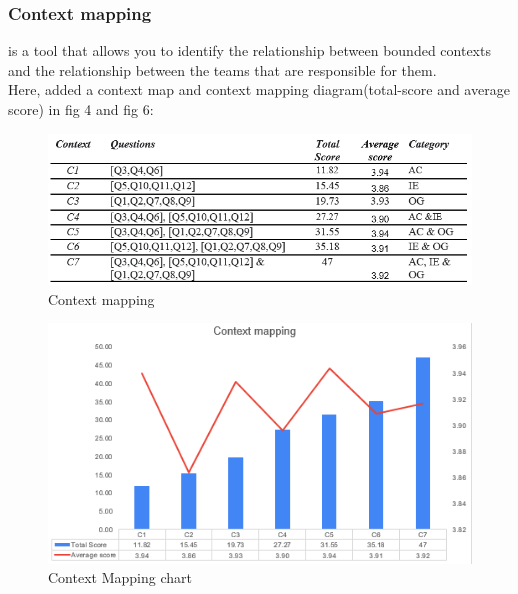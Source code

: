\documentclass[runningheads]{llncs}
\begin{document}
\subsubsection{Context mapping}
is a tool that allows you to identify the relationship between bounded contexts and the relationship between the teams that are responsible for them.\\Here, added a context map and context mapping diagram(total-score and average score) in fig 4 and fig 6:
\begin{figure}[h]
\centerline{\includegraphics[width=5 in]{Context chart.png}}
\caption{Context mapping}
\label{fig}


\end{figure}
\begin{figure}[h]
    \centering
    \includegraphics[width=5 in]{Context mapping.png}
    \caption{Context Mapping chart}
    \label{fig:my_label}
\end{figure}

\vspace{3in}
\end{document}
